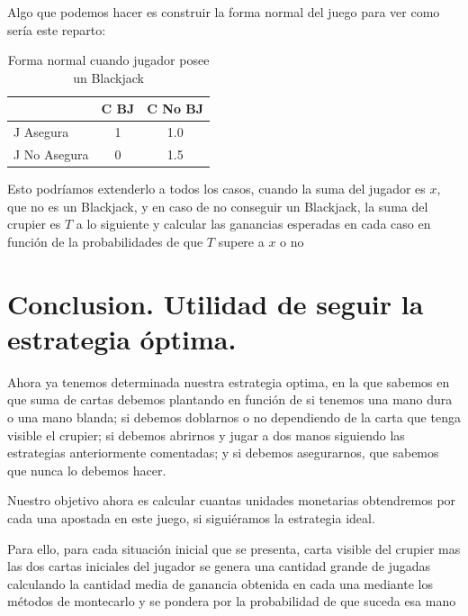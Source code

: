 \documentclass[12pt,a4paper,]{book}
\def\ifprincipal{} %
\numberwithin{dummy}{section}
\theoremstyle{ocrenumbox}
\theoremstyle{blacknumex}
\theoremstyle{blacknumbox}
\theoremstyle{ocrenum}
\theoremstyle{ocrenum}
\begin{document}
Algo que podemos hacer es construir la forma normal del juego para ver
como sería este reparto:

\begingroup\fontsize{12}{14}\selectfont

\begin{longtable}[t]{lcc}
\caption{\label{tab:unnamed-chunk-45}Forma normal cuando jugador posee un Blackjack}\\
\toprule
 & C BJ & C No BJ\\
\midrule
J Asegura & 1 & 1.0\\
J No Asegura & 0 & 1.5\\
\bottomrule
\end{longtable}
\endgroup{}

Esto podríamos extenderlo a todos los casos, cuando la suma del jugador
es \(x\), que no es un Blackjack, y en caso de no conseguir un
Blackjack, la suma del crupier es \(T\) a lo siguiente y calcular las
ganancias esperadas en cada caso en función de la probabilidades de que
\(T\) supere a \(x\) o no

\hypertarget{Seccion46}{%
\section{Conclusion. Utilidad de seguir la estrategia
óptima.}\label{Seccion46}}

Ahora ya tenemos determinada nuestra estrategia optima, en la que
sabemos en que suma de cartas debemos plantando en función de si tenemos
una mano dura o una mano blanda; si debemos doblarnos o no dependiendo
de la carta que tenga visible el crupier; si debemos abrirnos y jugar a
dos manos siguiendo las estrategias anteriormente comentadas; y si
debemos asegurarnos, que sabemos que nunca lo debemos hacer.

Nuestro objetivo ahora es calcular cuantas unidades monetarias
obtendremos por cada una apostada en este juego, si siguiéramos la
estrategia ideal.

Para ello, para cada situación inicial que se presenta, carta visible
del crupier mas las dos cartas iniciales del jugador se genera una
cantidad grande de jugadas calculando la cantidad media de ganancia
obtenida en cada una mediante los métodos de montecarlo y se pondera por
la probabilidad de que suceda esa mano

\FloatBarrier

\ifdefined\ifprincipal
\else
\setlength{\parindent}{1em}
\pagestyle{fancy}
\setcounter{tocdepth}{4}
\tableofcontents
\end{document}
